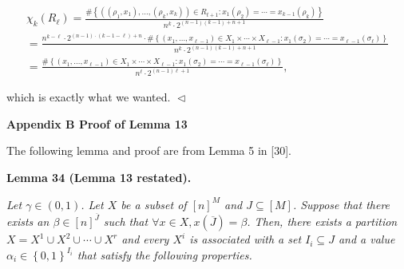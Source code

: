 \documentclass[10pt,a4paper]{article}
\begin{document}
\[\begin{gathered}
\displaystyle\chi_{k}(R_{\ell}) \displaystyle=\frac{\#\left\{((\rho_{1},x_{1}),\dots,(\rho_{k},x_{k}))\in R_{t+1}:x_{1}(\rho_{2})=\cdots=x_{k-1}(\rho_{k})\right\}}{n^{k}\cdot 2^{(n-1)(k-1)+n+1}} \\
\displaystyle=\frac{n^{k-\ell}\cdot 2^{(n-1)\cdot(k-1-\ell)+n}\cdot\#\left\{(x_{1},\dots,x_{\ell-1})\in X_{1}\times\cdots\times X_{\ell-1}:x_{1}(\sigma_{2})=\cdots=x_{\ell-1}(\sigma_{\ell})\right\}}{n^{k}\cdot 2^{(n-1)(k-1)+n+1}} \\
\displaystyle=\frac{\#\left\{(x_{1},\dots,x_{\ell-1})\in X_{1}\times\cdots\times X_{\ell-1}:x_{1}(\sigma_{2})=\cdots=x_{\ell-1}(\sigma_{\ell})\right\}}{n^{\ell}\cdot 2^{(n-1)\ell+1}},
\end{gathered}\]


which is exactly what we wanted.
$\vartriangleleft$\par






\par\medskip\noindent\textbf{
Appendix B Proof of Lemma 13
}\par




The following lemma and proof are from Lemma 5 in [30].\par





\par\medskip\noindent\textbf{
\textbf{Lemma 34}\textbf{ }(Lemma 13 restated)\textbf{.}
}\par



\emph{Let $\gamma\in(0,1)$.
Let $X$ be a subset of $[n]^{M}$ and $J\subseteq[M]$.
Suppose that there exists an $\beta\in[n]^{\overline{J}}$ such that $\forall x\in X,x(\overline{J})=\beta$.
Then, there exists a partition
$X=X^{1}\cup X^{2}\cup\cdots\cup X^{r}$
and every $X^{i}$ is associated with a set $I_{i}\subseteq J$ and a value $\alpha_{i}\in\left\{0,1\right\}^{I_{i}}$ that satisfy the following properties.}\par
\end{document}
